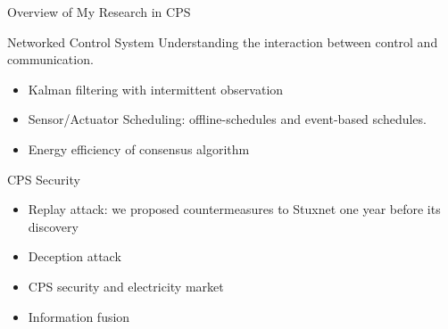 \documentclass[10pt]{beamer}
\begin{document}
\begin{frame}{Overview of My Research in CPS}
\begin{block}{Networked Control System}
  Understanding the interaction between control and communication.
 \begin{itemize}
  \item Kalman filtering with intermittent observation
  \item Sensor/Actuator Scheduling: offline-schedules and event-based schedules.
  \item Energy efficiency of consensus algorithm
 \end{itemize}
\end{block}
\begin{block}{CPS Security}
\begin{itemize}
  \item Replay attack: we proposed countermeasures to Stuxnet one year before its discovery
  \item Deception attack
  \item CPS security and electricity market
  \item Information fusion
\end{itemize}
\end{block}

  
\end{frame}
\end{document}
